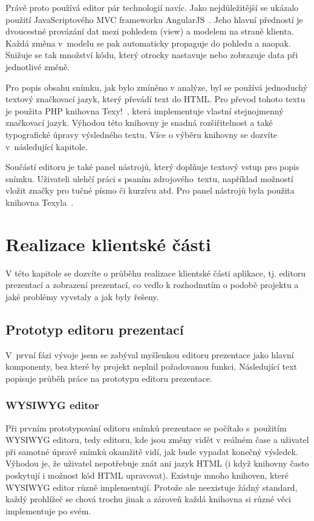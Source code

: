 \documentclass[11pt,twoside,a4paper]{book}
\newcommand*{\nom}[2]{#1 \nomenclature{#1}{#2}} 			%
\begin{document}
Právě proto používá editor pár technologií navíc. Jako nejdůležitější se ukázalo použití JavaScriptového \nom{MVC}{Model-View-Controller} frameworku AngularJS~\cite{angular}. Jeho hlavní předností je dvoucestné provázání dat mezi pohledem (view) a modelem na straně klienta. Každá změna v~modelu se pak automaticky propaguje do pohledu a naopak. Snižuje se tak množství kódu, který otrocky nastavuje nebo zobrazuje data při jednotlivé změně. 

Pro popis obsahu snímku, jak bylo zmíněno v analýze, byl se používá jednoduchý textový značkovací jazyk, který převádí text do HTML. Pro převod tohoto textu je použita PHP knihovna Texy!~\cite{texy}, která implementuje vlastní stejnojmenný značkovací jazyk. Výhodou této knihovny je snadná rozšiřitelnost a také typografické úpravy výsledného textu. Více o výběru knihovny se dozvíte v~následující kapitole.

Součástí editoru je také panel nástrojů, který doplňuje textový vstup pro popis snímku. Uživateli ulehčí práci s psaním zdrojového~textu, například možností vložit značky pro tučné písmo či kurzívu atd. Pro panel nástrojů byla použita knihovna Texyla~\cite{texyla}.



\chapter{Realizace klientské části} \label{chap:realizace}
V této kapitole se dozvíte o průběhu realizace klientské části aplikace, tj. editoru prezentací a zobrazení prezentací, co vedlo k rozhodnutím o podobě projektu a jaké problémy vyvstaly a jak byly řešeny.

\section{Prototyp editoru prezentací}
V~první fázi vývoje jsem se zabýval myšlenkou editoru prezentace jako hlavní komponenty, bez které by projekt neplnil požadovanou funkci. Následující text popisuje průběh práce na prototypu editoru prezentace.

\subsection{WYSIWYG editor}
Při prvním prototypování editoru snímků prezentace se počítalo s~použitím WYSIWYG editoru, tedy editoru, kde jsou změny vidět v reálném čase a uživatel při samotné úpravě snímků okamžitě vidí, jak bude vypadat konečný výsledek. Výhodou je, že uživatel nepotřebuje znát ani jazyk HTML (i když knihovny často poskytují i možnost kód HTML upravovat). Existuje mnoho knihoven, které WYSIWYG editor různě implementují. Protože ale neexistuje žádný standard, každý prohlížeč se chová trochu jinak a zároveň každá knihovna si různé věci implementuje po svém.
\end{document}

